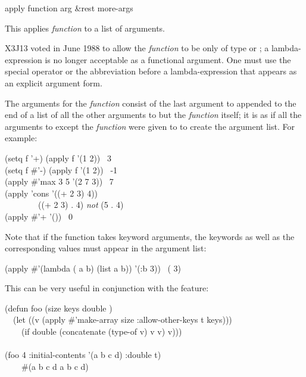 \begin{defun}[Function]
apply function arg &rest more-args

This applies \emph{function} to a list of arguments.
\begin{newer}
X3J13 voted in June 1988  to allow the \emph{function}
to be only of type  or ; a lambda-expression
is no longer acceptable as a functional argument.  One must use the
 special operator or the abbreviation  before
a lambda-expression that appears as an  explicit argument form.
\end{newer}
The arguments for the \emph{function} consist of the last argument
to  appended to the end of a list of all the other
arguments to  but the \emph{function} itself;
it is as if all the arguments to  except the \emph{function}
were given to  to create the argument list.
For example:
\begin{lisp}
(setq f '+) (apply f '(1 2)) \EV\ 3 \\
(setq f \#'-) (apply f '(1 2)) \EV\ -1 \\
(apply \#'max 3 5 '(2 7 3)) \EV\ 7 \\
(apply 'cons '((+ 2 3) 4)) {\EV} \\
~~~~~~~~((+ 2 3) . 4)	\emph{not} (5 . 4) \\
(apply \#'+ '()) \EV\ 0
\end{lisp}
Note that if the function takes keyword arguments, the
keywords as well as the corresponding values must appear in the argument
list:
\begin{lisp}
(apply \#'(lambda ( a b) (list a b)) '(:b 3)) \EV\ ({\nil} 3)
\end{lisp}
This can be very useful in conjunction with the  feature:
\begin{lisp}
(defun foo (size  keys  double ) \\
~~(let ((v (apply \#'make-array size :allow-other-keys t keys))) \\
~~~~(if double (concatenate (type-of v) v v) v))) \\
 \\
(foo 4 :initial-contents '(a b c d) :double t) \\
~~~\EV\ \#(a b c d a b c d)
\end{lisp}
\end{defun}

